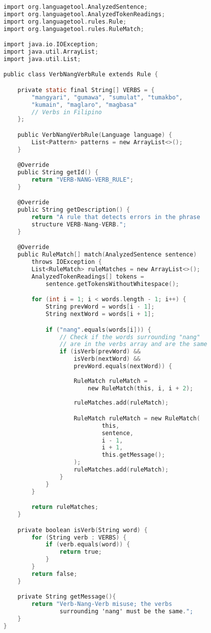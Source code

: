 \begin{lstlisting}[language=C, caption=Implementation of Verb-Nang-Verb Grammar Rule in Java]
import org.languagetool.AnalyzedSentence;
import org.languagetool.AnalyzedTokenReadings;
import org.languagetool.rules.Rule;
import org.languagetool.rules.RuleMatch;

import java.io.IOException; 
import java.util.ArrayList;
import java.util.List;

public class VerbNangVerbRule extends Rule {

    private static final String[] VERBS = {
        "mangyari", "gumawa", "sumulat", "tumakbo", 
        "kumain", "maglaro", "magbasa"  
        // Verbs in Filipino
    };

    public VerbNangVerbRule(Language language) {
        List<Pattern> patterns = new ArrayList<>();
    }

    @Override
    public String getId() {
        return "VERB-NANG-VERB_RULE";
    }

    @Override
    public String getDescription() {
        return "A rule that detects errors in the phrase 
        structure VERB-Nang-VERB.";
    }

    @Override
    public RuleMatch[] match(AnalyzedSentence sentence) 
        throws IOException {
        List<RuleMatch> ruleMatches = new ArrayList<>();
        AnalyzedTokenReadings[] tokens = 
            sentence.getTokensWithoutWhitespace();

        for (int i = 1; i < words.length - 1; i++) {
            String prevWord = words[i - 1];
            String nextWord = words[i + 1];

            if ("nang".equals(words[i])) {
                // Check if the words surrounding "nang" 
                // are in the verbs array and are the same
                if (isVerb(prevWord) && 
                    isVerb(nextWord) && 
                    prevWord.equals(nextWord)) {
                    
                    RuleMatch ruleMatch = 
                        new RuleMatch(this, i, i + 2);
                    
                    ruleMatches.add(ruleMatch);

                    RuleMatch ruleMatch = new RuleMatch(
                            this,
                            sentence,
                            i - 1,
                            i + 1,
                            this.getMessage();
                    );
                    ruleMatches.add(ruleMatch);
                }
            }
        }

        return ruleMatches;
    }

    private boolean isVerb(String word) {
        for (String verb : VERBS) {
            if (verb.equals(word)) {
                return true;
            }
        }
        return false;
    }

    private String getMessage(){
        return "Verb-Nang-Verb misuse; the verbs 
                surrounding 'nang' must be the same.";
    }
}
\end{lstlisting}

